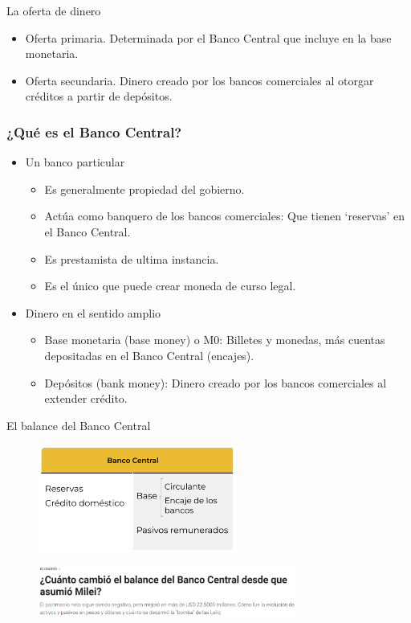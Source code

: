 \documentclass{beamer}
\begin{document}
\begin{frame}{La oferta de dinero}
    \begin{itemize}
       \item Oferta primaria. Determinada por el Banco Central que incluye en la base monetaria.
       \item Oferta secundaria. Dinero creado por los bancos comerciales al otorgar créditos a partir de depósitos.
       \end{itemize}
\end{frame}

\begin{frame}
\frametitle{¿Qué es el Banco Central?}
\begin{itemize}
    \item Un banco particular
        \begin{itemize}
            \item Es generalmente propiedad del gobierno.
            \item Actúa como banquero de los bancos comerciales: Que tienen `reservas' en el Banco Central.
            \item Es prestamista de ultima instancia.
            \item Es el único que puede crear moneda de curso legal.
        \end{itemize}
    \item Dinero en el sentido amplio
        \begin{itemize}
            \item Base monetaria (base money) o M0: Billetes y monedas, más cuentas depositadas en el Banco Central (encajes).
            \item Depósitos (bank money): Dinero creado por los bancos comerciales al extender crédito.
        \end{itemize}
\end{itemize}
\end{frame}

\begin{frame}{El balance del Banco Central}
        \begin{figure} [H] 
            \centering
            \includegraphics[width=6.5cm]{../Figures/C37.8.png}
        \end{figure}
        \begin{figure} [H] 
            \centering
            \includegraphics[width=8.5cm]{../Figures/Mejora_Balance_Central.png}
        \end{figure}
\end{frame}
\end{document}
